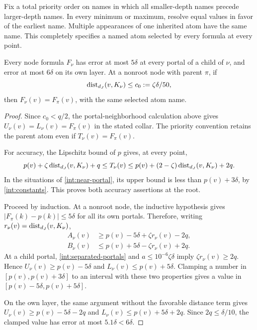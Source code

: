Fix a total priority order on names in which all smaller-depth names
precede larger-depth names. In every minimum or maximum, resolve
equal values in favor of the earliest name. Multiple appearances of
one inherited atom have the same name. This completely specifies a
named atom selected by every formula at every point.

\begin{lemma}\label{int:deterministic}
Every node formula $F_\nu$ has error at most $5\delta$ at every portal
of a child of $\nu$, and error at most $6\delta$ on its own layer.
At a nonroot node with parent $\pi$, if
\[
 \operatorname{dist}_{d_J}(v,K_\nu)\le c_0:=\zeta\delta/50,
\]
then $F_\nu(v)=F_\pi(v)$, with the same selected atom name.
\end{lemma}

\begin{proof}
Since $c_0<q/2$, the portal-neighborhood calculation above gives
$U_\nu(v)=L_\nu(v)=F_\pi(v)$ in the stated collar. The priority
convention retains the parent atom even if $T_\nu(v)=F_\pi(v)$.

For accuracy, the Lipschitz bound of $p$ gives, at every point,
\begin{equation}\label{int:tentative-bounds}
 p(v)+\zeta\operatorname{dist}_{d_J}(v,K_\nu)+q
 \le T_\nu(v)
 \le p(v)+(2-\zeta)\operatorname{dist}_{d_J}(v,K_\nu)+2q.
\end{equation}
In the situations of \eqref{int:near-portal}, its upper bound is
less than $p(v)+3\delta$, by \eqref{int:constants}.  This proves both
accuracy assertions at the root.

Proceed by induction.  At a nonroot node, the inductive hypothesis
gives $|F_\pi(k)-p(k)|\le5\delta$ for all its own portals.  Therefore,
writing $r_\nu(v)=\operatorname{dist}_{d_J}(v,K_\nu)$,
\begin{align}
 A_\nu(v)&\ge p(v)-5\delta+\zeta r_\nu(v)-2q,
 \label{int:upper-atom-bound}\\
 B_\nu(v)&\le p(v)+5\delta-\zeta r_\nu(v)+2q.
 \label{int:lower-atom-bound}
\end{align}
At a child portal, \eqref{int:separated-portals} and
$a\le10^{-6}\zeta\delta$ imply
$\zeta r_\nu(v)\ge2q$.  Hence
$U_\nu(v)\ge p(v)-5\delta$ and
$L_\nu(v)\le p(v)+5\delta$.  Clamping a number in
$[p(v),p(v)+3\delta]$ to an interval with these two properties gives
a value in $[p(v)-5\delta,p(v)+5\delta]$.

On the own layer, the same argument without the favorable distance
term gives $U_\nu(v)\ge p(v)-5\delta-2q$ and
$L_\nu(v)\le p(v)+5\delta+2q$.  Since $2q\le\delta/10$, the
clamped value has error at most $5.1\delta<6\delta$.
\end{proof}

